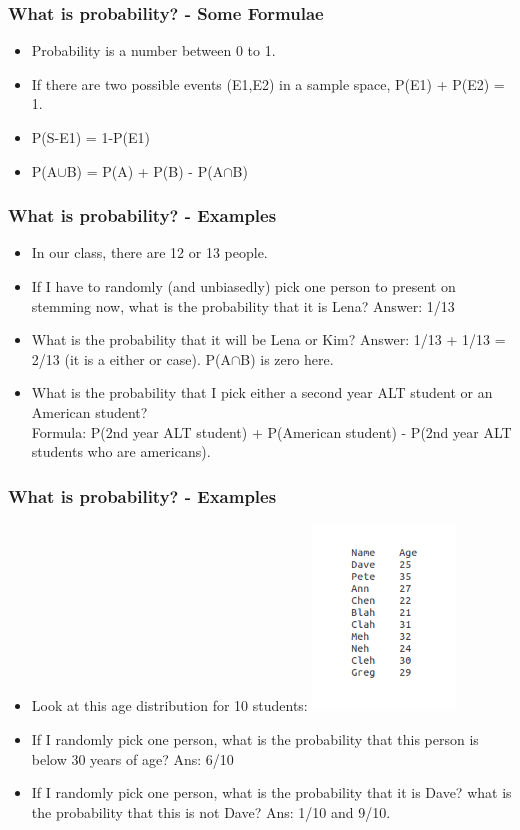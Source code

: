 \documentclass{beamer}
\begin{document}
\begin{frame}
\frametitle{What is probability? - Some Formulae}
\begin{itemize}
\item Probability is a number between 0 to 1. \pause
\item If there are two possible events (E1,E2) in a sample space, P(E1) + P(E2) = 1. \pause
\item P(S-E1) = 1-P(E1) \pause
\item P(A$\cup$B) = P(A) + P(B) - P(A$\cap$B) \pause
\end{itemize}
\end{frame}

\begin{frame}
\frametitle{What is probability? - Examples}
\begin{itemize}
\item In our class, there are 12 or 13 people. 
\item If I have to randomly (and unbiasedly) pick one person to present on stemming now, what is the probability that it is Lena? \pause Answer: 1/13
\item What is the probability that it will be Lena or Kim? \pause Answer: 1/13 + 1/13 = 2/13 (it is a either or case). P(A$\cap$B) is zero here. 
\item What is the probability that I pick either a second year ALT student or an American student? \pause
\\ Formula: P(2nd year ALT student) + P(American student) - P(2nd year ALT students who are americans).
\end{itemize}
\end{frame}

\begin{frame}
\frametitle{What is probability? - Examples}
\begin{itemize}
\item Look at this age distribution for 10 students: 
\includegraphics[width=0.3\textwidth]{prob1.png}
\item If I randomly pick one person, what is the probability that this person is below 30 years of age? \pause Ans: 6/10
\item If I randomly pick one person, what is the probability that it is Dave? what is the probability that this is not Dave? \pause Ans: 1/10 and 9/10.
\end{itemize}
\end{frame}
\end{document}
